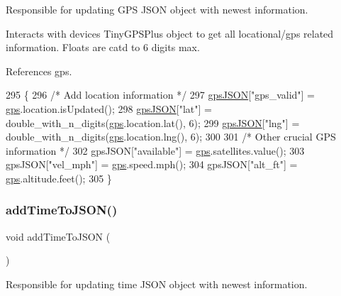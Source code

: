 Responsible for updating G\+PS J\+S\+ON object with newest information. 

Interacts with devices Tiny\+G\+P\+S\+Plus object to get all locational/gps related information. Floats are cat\textquotesingle{}d to 6 digits max. 

References gps.


\begin{DoxyCode}
295 \{
296   \textcolor{comment}{/* Add location information */}
297   \hyperlink{logging-device_8ino_a548727e041a5cd3db91bdbd0ccd71e30}{gpsJSON}[\textcolor{stringliteral}{"gps\_valid"}] = \hyperlink{logging-device_8ino_a169c53997a7da1d0fb99aec1b4675ce8}{gps}.location.isUpdated();
298   \hyperlink{logging-device_8ino_a548727e041a5cd3db91bdbd0ccd71e30}{gpsJSON}[\textcolor{stringliteral}{"lat"}] = double\_with\_n\_digits(\hyperlink{logging-device_8ino_a169c53997a7da1d0fb99aec1b4675ce8}{gps}.location.lat(), 6);
299   \hyperlink{logging-device_8ino_a548727e041a5cd3db91bdbd0ccd71e30}{gpsJSON}[\textcolor{stringliteral}{"lng"}] = double\_with\_n\_digits(\hyperlink{logging-device_8ino_a169c53997a7da1d0fb99aec1b4675ce8}{gps}.location.lng(), 6);
300 
301   \textcolor{comment}{/* Other crucial GPS information */}
302   gpsJSON[\textcolor{stringliteral}{"available"}] = \hyperlink{logging-device_8ino_a169c53997a7da1d0fb99aec1b4675ce8}{gps}.satellites.value();
303   gpsJSON[\textcolor{stringliteral}{"vel\_mph"}] = \hyperlink{logging-device_8ino_a169c53997a7da1d0fb99aec1b4675ce8}{gps}.speed.mph();
304   gpsJSON[\textcolor{stringliteral}{"alt\_ft"}] = \hyperlink{logging-device_8ino_a169c53997a7da1d0fb99aec1b4675ce8}{gps}.altitude.feet();
305 \}
\end{DoxyCode}
\mbox{\label{logging-device_8ino_a9e4931f452cd25dfff67d41e7c9c0efb}} 
\subsubsection{\texorpdfstring{add\+Time\+To\+J\+S\+O\+N()}{addTimeToJSON()}}
{\footnotesize\ttfamily void add\+Time\+To\+J\+S\+ON (\begin{DoxyParamCaption}{ }\end{DoxyParamCaption})}



Responsible for updating time J\+S\+ON object with newest information. 


